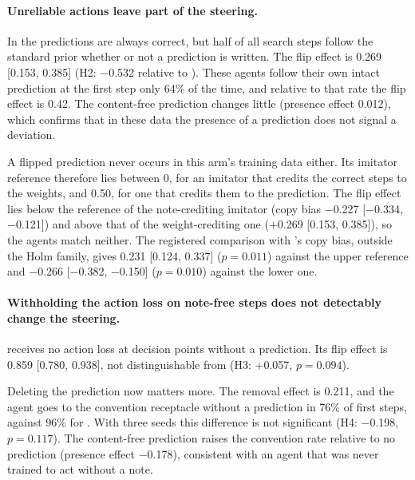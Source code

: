 \paragraph{Unreliable actions leave part of the steering.}
In  the predictions are always correct, but half of all search steps follow the standard prior whether or not a prediction is written. The flip effect is 0.269 [0.153, 0.385] (H2: $-$0.532 relative to ). These agents follow their own intact prediction at the first step only 64\% of the time, and relative to that rate the flip effect is 0.42. The content-free prediction changes little (presence effect 0.012), which confirms that in these data the presence of a prediction does not signal a deviation.

A flipped prediction never occurs in this arm's training data either. Its imitator reference therefore lies between 0, for an imitator that credits the correct steps to the weights, and 0.50, for one that credits them to the prediction. The flip effect lies below the reference of the note-crediting imitator (copy bias $-$0.227 [$-$0.334, $-$0.121]) and above that of the weight-crediting one ($+$0.269 [0.153, 0.385]), so the agents match neither. The registered comparison with 's copy bias, outside the Holm family, gives 0.231 [0.124, 0.337] ($p = 0.011$) against the upper reference and $-$0.266 [$-$0.382, $-$0.150] ($p = 0.010$) against the lower one.

\paragraph{Withholding the action loss on note-free steps does not detectably change the steering.}
 receives no action loss at decision points without a prediction. Its flip effect is 0.859 [0.780, 0.938], not distinguishable from  (H3: +0.057, $p = 0.094$).

Deleting the prediction now matters more. The removal effect is 0.211, and the agent goes to the convention receptacle without a prediction in 76\% of first steps, against 96\% for . With three seeds this difference is not significant (H4: $-$0.198, $p = 0.117$). The content-free prediction raises the convention rate relative to no prediction (presence effect $-$0.178), consistent with an agent that was never trained to act without a note.
